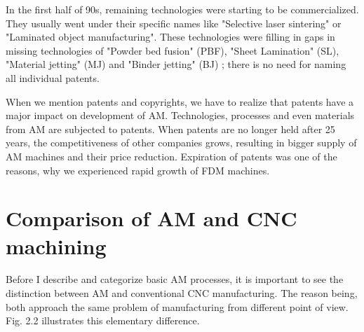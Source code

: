 \documentclass[a4paper, twoside, 11pt]{report}
\begin{document}
	In the first half of 90s, remaining technologies were starting to be commercialized. They usually went under their specific names like "Selective laser sintering" or  "Laminated object manufacturing". These technologies were filling in gaps in missing technologies of "Powder bed fusion" (PBF), "Sheet Lamination" (SL), "Material jetting" (MJ) and "Binder jetting" (BJ) ; there is no need for naming all individual patents.
	
	When we mention patents and copyrights, we have to realize that patents have a major impact on development of AM. Technologies, processes and even materials from AM are subjected to patents. When patents are no longer held after 25 years, the competitiveness of other companies grows, resulting in bigger supply of AM machines and their price reduction. Expiration of patents was one of the reasons, why we experienced rapid growth of FDM machines.

\section{Comparison of AM and CNC machining}
%
Before I describe and categorize basic AM processes, it is important to see the distinction between AM and conventional CNC manufacturing. The reason being, both approach the same problem of manufacturing from different point of view. Fig. 2.2 illustrates this elementary difference.
\end{document}
